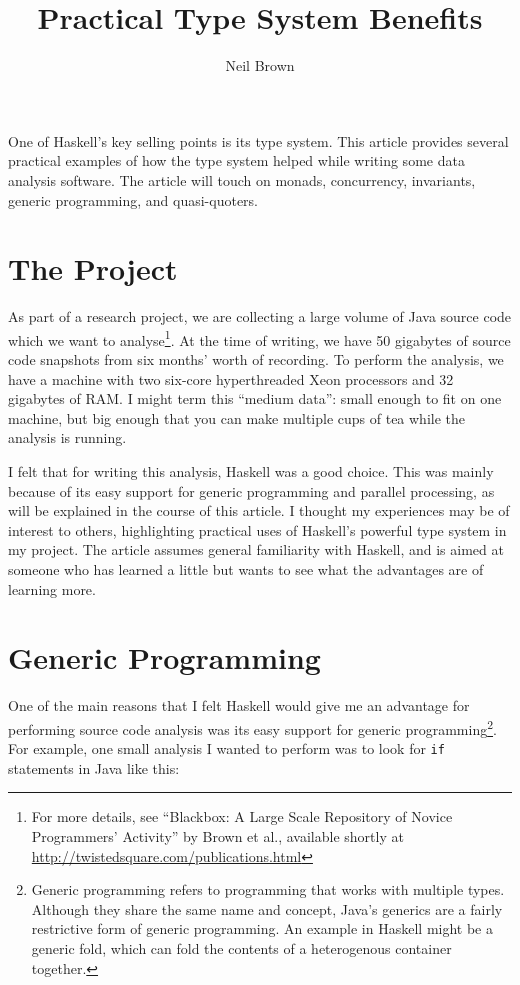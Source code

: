 \documentclass{tmr}
\title{Practical Type System Benefits}
\author{Neil Brown\email{neil@twistedsquare.com}}
\begin{document}
\begin{introduction} 
One of Haskell's key selling points is its type system.  This article provides several practical examples of how the type system helped while writing some data analysis software.  The article will touch on monads, concurrency, invariants, generic programming, and quasi-quoters.
\end{introduction}

\section{The Project}

As part of a research project, we are collecting a large volume of Java source code which we want to analyse\footnote{For more details, see ``Blackbox: A Large Scale Repository of Novice Programmers' Activity'' by Brown et al., available shortly at \url{http://twistedsquare.com/publications.html}}.  At the time of writing, we have 50 gigabytes of source code snapshots from six months' worth of recording.  To perform the analysis, we have a machine with two six-core hyperthreaded Xeon processors and 32 gigabytes of RAM\@.  I might term this ``medium data'': small enough to fit on one machine, but big enough that you can make multiple cups of tea while the analysis is running.

I felt that for writing this analysis, Haskell was a good choice.  This was mainly because of its easy support for generic programming and parallel processing, as will be explained in the course of this article.  I thought my experiences may be of interest to others, highlighting practical uses of Haskell's powerful type system in my project.  The article assumes general familiarity with Haskell, and is aimed at someone who has learned a little but wants to see what the advantages are of learning more.


\section{Generic Programming}

One of the main reasons that I felt Haskell would give me an advantage for performing source code analysis was its easy support for generic programming\footnote{Generic programming refers to programming that works with multiple types.  Although they share the same name and concept, Java's generics are a fairly restrictive form of generic programming.  An example in Haskell might be a generic fold, which can fold the contents of a heterogenous container together.}. For example, one small analysis I wanted to perform was to look for \lstinline|if| statements in Java like this:
\end{document}
